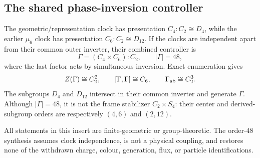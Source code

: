 \subsection*{The shared phase-inversion controller}
The geometric/representation clock has presentation $C_4:C_2\cong D_4$,
while the earlier $\mu_6$ clock has presentation $C_6:C_2\cong D_{12}$.
If the clocks are independent apart from their common outer inverter, their
combined controller is
\[
\Gamma=(C_4\times C_6):C_2,
\qquad |\Gamma|=48,
\]
where the last factor acts by simultaneous inversion.  Exact enumeration gives
\[
Z(\Gamma)\cong C_2^2,
\qquad
[\Gamma,\Gamma]\cong C_6,
\qquad
\Gamma_{\rm ab}\cong C_2^3.
\]
The subgroups $D_4$ and $D_{12}$ intersect in their common inverter and generate
$\Gamma$.  Although $|\Gamma|=48$, it is not the frame stabilizer
$C_2\times S_4$: their center and derived-subgroup orders are respectively
$(4,6)$ and $(2,12)$.

All statements in this insert are finite-geometric or group-theoretic.  The
order-$48$ synthesis assumes clock independence, is not a physical coupling,
and restores none of the withdrawn charge, colour, generation, flux, or
particle identifications.
